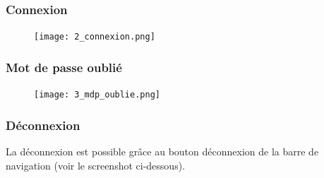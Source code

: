 \documentclass[a4paper,12pt]{article}
\begin{document}
\subsubsection{Connexion}
\begin{figure}[H]
    \centering
    \texttt{[image: 2\_connexion.png]}
\end{figure}


\subsubsection{Mot de passe oublié}
\begin{figure}[H]
    \centering
    \texttt{[image: 3\_mdp\_oublie.png]}
\end{figure}


\subsubsection{Déconnexion}
La déconnexion est possible grâce au bouton déconnexion de la barre de navigation (voir le screenshot ci-dessous).
\end{document}
